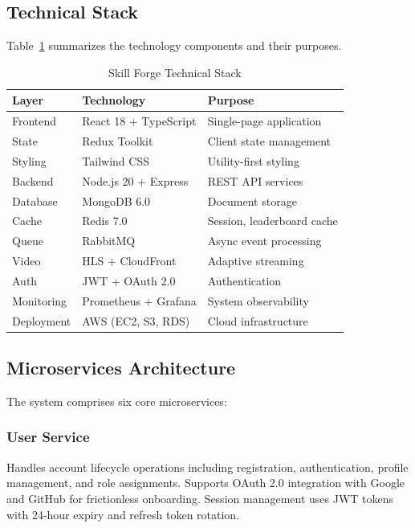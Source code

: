 \documentclass[journal]{IEEEtran}
\begin{document}
\subsection{Technical Stack}

Table~\ref{tab:techstack} summarizes the technology components and their purposes.

\begin{table}[htbp]
\caption{Skill Forge Technical Stack}
\label{tab:techstack}
\centering
\begin{tabular}{lll}
\toprule
\textbf{Layer} & \textbf{Technology} & \textbf{Purpose} \\
\midrule
Frontend & React 18 + TypeScript & Single-page application \\
State & Redux Toolkit & Client state management \\
Styling & Tailwind CSS & Utility-first styling \\
Backend & Node.js 20 + Express & REST API services \\
Database & MongoDB 6.0 & Document storage \\
Cache & Redis 7.0 & Session, leaderboard cache \\
Queue & RabbitMQ & Async event processing \\
Video & HLS + CloudFront & Adaptive streaming \\
Auth & JWT + OAuth 2.0 & Authentication \\
Monitoring & Prometheus + Grafana & System observability \\
Deployment & AWS (EC2, S3, RDS) & Cloud infrastructure \\
\bottomrule
\end{tabular}
\end{table}

\subsection{Microservices Architecture}

The system comprises six core microservices:

\subsubsection{User Service}
Handles account lifecycle operations including registration, authentication, profile management, and role assignments. Supports OAuth 2.0 integration with Google and GitHub for frictionless onboarding. Session management uses JWT tokens with 24-hour expiry and refresh token rotation.
\end{document}
